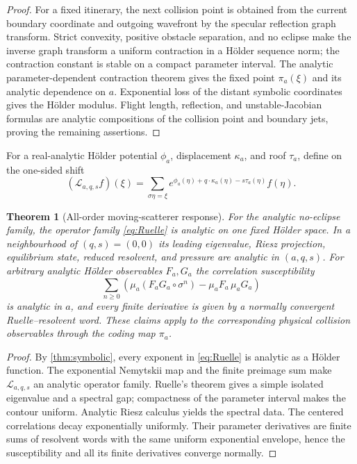 \documentclass[11pt,reqno]{amsart}
\newtheorem{theorem}{Theorem}[section]
\theoremstyle{definition}
\theoremstyle{remark}
\begin{document}
\begin{proof}
For a fixed itinerary, the next collision point is obtained from the current
boundary coordinate and outgoing wavefront by the specular reflection graph
transform.  Strict convexity, positive obstacle separation, and no eclipse
make the inverse graph transform a uniform contraction in a Hölder sequence
norm; the contraction constant is stable on a compact parameter interval.
The analytic parameter-dependent contraction theorem gives the fixed point
$\pi_a(\xi)$ and its analytic dependence on $a$.  Exponential loss of the
distant symbolic coordinates gives the Hölder modulus.  Flight length,
reflection, and unstable-Jacobian formulas are analytic compositions of the
collision point and boundary jets, proving the remaining assertions.
\end{proof}

For a real-analytic Hölder potential $\phi_a$, displacement $\kappa_a$, and
roof $\tau_a$, define on the one-sided shift
\begin{equation}\label{eq:Ruelle}
 (\mathscr L_{a,q,s}f)(\xi)=
 \sum_{\sigma\eta=\xi}
 e^{\phi_a(\eta)+q\cdot\kappa_a(\eta)-s\tau_a(\eta)}f(\eta).
\end{equation}

\begin{theorem}[All-order moving-scatterer response]\label{thm:open-billiard}
For the analytic no-eclipse family, the operator family
\eqref{eq:Ruelle} is analytic on one fixed Hölder space.  In a neighbourhood
of $(q,s)=(0,0)$ its leading eigenvalue, Riesz projection, equilibrium state,
reduced resolvent, and pressure are analytic in $(a,q,s)$.  For arbitrary
analytic Hölder observables $F_a,G_a$ the correlation susceptibility
\[
 \sum_{n\ge0}
 \left(\mu_a(F_aG_a\circ\sigma^n)-\mu_aF_a\,\mu_aG_a\right)
\]
is analytic in $a$, and every finite derivative is given by a normally
convergent Ruelle--resolvent word.  These claims apply to the corresponding
physical collision observables through the coding map $\pi_a$.
\end{theorem}

\begin{proof}
By \cref{thm:symbolic}, every exponent in \eqref{eq:Ruelle} is analytic as a
Hölder function.  The exponential Nemytskii map and the finite preimage sum
make $\mathscr L_{a,q,s}$ an analytic operator family.  Ruelle's theorem gives
a simple isolated eigenvalue and a spectral gap; compactness of the parameter
interval makes the contour uniform.  Analytic Riesz calculus yields the
spectral data.  The centered correlations decay exponentially uniformly.
Their parameter derivatives are finite sums of resolvent words with the same
uniform exponential envelope, hence the susceptibility and all its finite
derivatives converge normally.
\end{proof}
\end{document}
